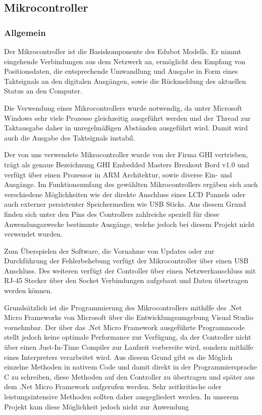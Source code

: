 \subsection{Mikrocontroller}
\subsubsection{Allgemein}
Der Mikrocontroller ist die Basiskomponente des Edubot Modells. Er nimmt eingehende Verbindungen aus dem Netzwerk an, ermöglicht den Empfang von Positionsdaten, die entsprechende Umwandlung und Ausgabe in Form eines Taktsignals an den digitalen Ausgängen, sowie die Rückmeldung des aktuellen Status an den Computer.

Die Verwendung eines Mikrocontrollers wurde notwendig, da unter Microsoft Windows sehr viele Prozesse gleichzeitig ausgeführt werden und der Thread zur Taktausgabe daher in unregelmäßigen Abständen ausgeführt wird. Damit wird auch die Ausgabe des Taktsignals instabil.

Der von uns verwendete Mikrocontroller wurde von der Firma GHI vertrieben, trägt als genaue Bezeichnung GHI Embedded Masters Breakout Bord v1.0 und verfügt über einen Prozessor in ARM Architektur, sowie diverse Ein- und Ausgänge. Im Funktionsumfang des gewählten Mikrocontrollers ergäben sich auch verschiedene Möglichkeiten wie der direkte Anschluss eines LCD Pannels oder auch externer persistenter Speichermedien wie USB Sticks. Aus diesem Grund finden sich unter den Pins des Controllers zahlreiche speziell für diese Anwendungszwecke bestimmte Ausgänge, welche jedoch bei diesem Projekt nicht verwendet wurden.

Zum Überspielen der Software, die Vornahme von Updates oder zur Durchführung der Fehlerbehebung verfügt der Mikrocontroller über einen USB Anschluss. Des weiteren verfügt der Controller über einen Netzwerkanschluss mit RJ-45 Stecker über den Socket Verbindungen aufgebaut und Daten übertragen werden können.

Grundsätzlich ist die Programmierung des Mikrocontrollers mithilfe des .Net Micro Frameworks von Microsoft über die Entwicklungsumgebung Visual Studio vornehmbar. Der über das .Net Micro Framework ausgeführte Programmcode stellt jedoch keine optimale Performance zur Verfügung, da der Controller nicht über einen Just-In-Time Compiler zur Laufzeit vorbereite wird, sondern mithilfe eines Interpreters verarbeitet wird. Aus diesem Grund gibt es die Möglich einzelne Methoden in nativem Code und damit direkt in der Programmiersprache C zu schreiben, diese Methoden auf den Controller zu übertragen und später aus dem .Net Micro Framework aufgerufen werden. Sehr zeitkritische oder leistungsintensive Methoden sollten daher ausgegliedert werden. In unserem Projekt kam diese Möglichkeit jedoch nicht zur Anwendung

